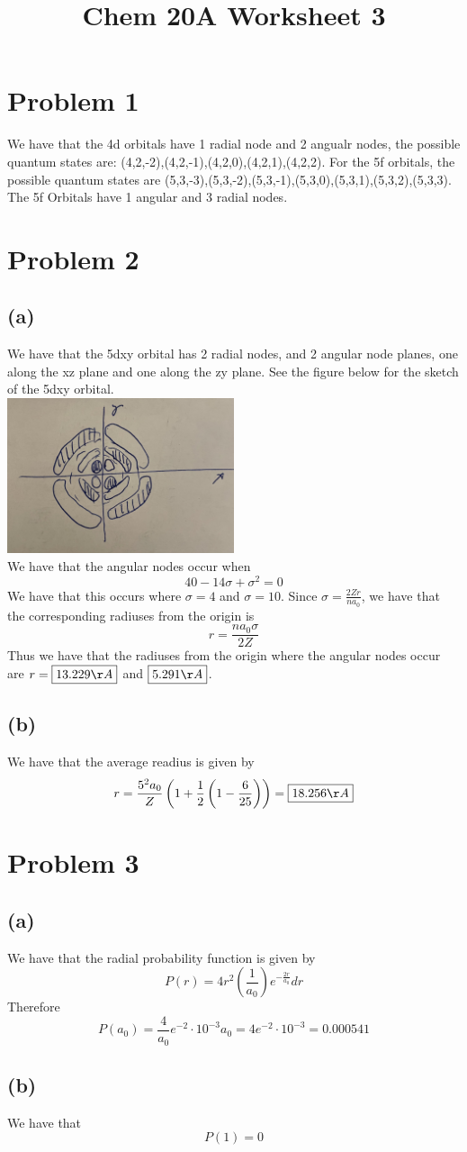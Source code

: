 
\title{Chem 20A Worksheet 3}

\maketitle
\section*{Problem 1}
We have that the 4d orbitals have 1 radial node and 2 angualr nodes, the possible quantum states are:
(4,2,-2),(4,2,-1),(4,2,0),(4,2,1),(4,2,2). For the 5f orbitals, the possible quantum states are
(5,3,-3),(5,3,-2),(5,3,-1),(5,3,0),(5,3,1),(5,3,2),(5,3,3). The 5f Orbitals have 1 angular and 3 radial 
nodes.
\section*{Problem 2}
\subsection*{(a)}
We have that the 5dxy orbital has 2 radial nodes, and 2 angular node planes, one along the xz 
plane and one along the zy plane. See the figure below for the sketch of the 5dxy orbital.\\
\includegraphics[width=0.5\textwidth]{5dxy.png}
\\
We have that the angular nodes occur when 
$$40-14\sigma+\sigma^2=0$$
We have that this occurs where $\sigma=4$ and $\sigma=10$. Since 
$\sigma=\frac{2Zr}{na_0}$, we have that the corresponding radiuses from the origin is
$$r=\frac{na_0\sigma}{2Z}$$
Thus we have that the radiuses from the origin where the angular nodes occur are
$r=\boxed{13.229\AA}$ and $\boxed{5.291\AA}$.
\subsection*{(b)}
We have that the average readius is given by
$$r=\frac{5^2a_0}{Z}\left(1+\frac{1}{2}\left(1-\frac{6}{25}\right)\right)=\boxed{18.256\AA}$$
\section*{Problem 3}
\subsection*{(a)}
We have that the radial probability function is given by 
$$P(r)=4r^2\left(\frac{1}{a_0}\right)e^{-\frac{2r}{a_0}}dr$$
Therefore 
$$P(a_0)=\frac{4}{a_0}e^{-2}\cdot 10^{-3}a_0=4e^{-2}\cdot 10^{-3}=0.000541$$
\subsection*{(b)}
We have that
$$P(1)=0$$

